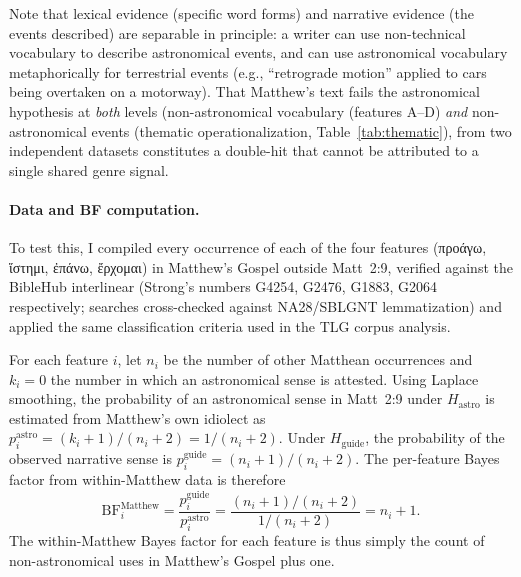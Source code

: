 \documentclass[11pt,a4paper]{article}
\newcommand{\grk}[1]{{\fontencoding{LGR}\selectfont #1}}
\newcommand{\grk}[1]{{\greekfont #1}}
\begin{document}
Note that lexical evidence (specific word forms) and narrative evidence (the
events described) are separable in principle: a writer can use non-technical
vocabulary to describe astronomical events, and can use astronomical vocabulary
metaphorically for terrestrial events (e.g., ``retrograde motion'' applied to
cars being overtaken on a motorway). That Matthew's text fails the astronomical
hypothesis at \emph{both} levels (non-astronomical vocabulary (features A--D)
\emph{and} non-astronomical events (thematic operationalization, Table~\ref{tab:thematic}), from
two independent datasets constitutes a double-hit that cannot be attributed to
a single shared genre signal.

\paragraph{Data and BF computation.}

To test this, I compiled every occurrence of each of the four features
(\grk{προάγω}, \grk{ἵστημι}, \grk{ἐπάνω}, \grk{ἔρχομαι}) in Matthew's Gospel
outside Matt~2:9, verified against the BibleHub interlinear (Strong's numbers
G4254, G2476, G1883, G2064 respectively; searches cross-checked against
NA28/SBLGNT lemmatization) and applied the same classification criteria used in
the TLG corpus analysis.

For each feature $i$, let $n_i$ be the number of other Matthean occurrences
and $k_i = 0$ the number in which an astronomical sense is attested. Using
Laplace smoothing, the probability of an astronomical sense in Matt~2:9 under
$H_\text{astro}$ is estimated from Matthew's own idiolect as
$p_i^\text{astro} = (k_i+1)/(n_i+2) = 1/(n_i+2)$.
Under $H_\text{guide}$, the probability of the observed narrative sense is
$p_i^\text{guide} = (n_i+1)/(n_i+2)$.
The per-feature Bayes factor from within-Matthew data is therefore
\begin{equation}
  \mathrm{BF}_i^\text{Matthew} = \frac{p_i^\text{guide}}{p_i^\text{astro}}
    = \frac{(n_i+1)/(n_i+2)}{1/(n_i+2)} = n_i + 1.
  \label{eq:bf_matthew_i}
\end{equation}
The within-Matthew Bayes factor for each feature is thus simply the count of
non-astronomical uses in Matthew's Gospel plus one.
\end{document}
